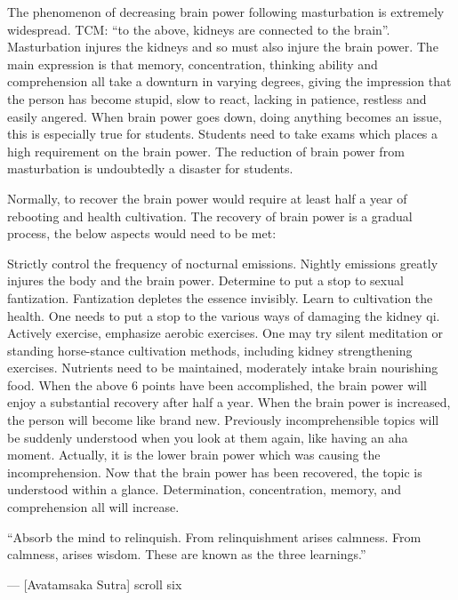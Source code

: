 \documentclass[
]{book}
\begin{document}
The phenomenon of decreasing brain power following masturbation is extremely widespread. TCM: ``to the above, kidneys are connected to the brain''. Masturbation injures the kidneys and so must also injure the brain power. The main expression is that memory, concentration, thinking ability and comprehension all take a downturn in varying degrees, giving the impression that the person has become stupid, slow to react, lacking in patience, restless and easily angered. When brain power goes down, doing anything becomes an issue, this is especially true for students. Students need to take exams which places a high requirement on the brain power. The reduction of brain power from masturbation is undoubtedly a disaster for students.

Normally, to recover the brain power would require at least half a year of rebooting and health cultivation. The recovery of brain power is a gradual process, the below aspects would need to be met:

Strictly control the frequency of nocturnal emissions. Nightly emissions greatly injures the body and the brain power.
Determine to put a stop to sexual fantization. Fantization depletes the essence invisibly.
Learn to cultivation the health. One needs to put a stop to the various ways of damaging the kidney qi.
Actively exercise, emphasize aerobic exercises.
One may try silent meditation or standing horse-stance cultivation methods, including kidney strengthening exercises.
Nutrients need to be maintained, moderately intake brain nourishing food.
When the above 6 points have been accomplished, the brain power will enjoy a substantial recovery after half a year. When the brain power is increased, the person will become like brand new. Previously incomprehensible topics will be suddenly understood when you look at them again, like having an aha moment. Actually, it is the lower brain power which was causing the incomprehension. Now that the brain power has been recovered, the topic is understood within a glance. Determination, concentration, memory, and comprehension all will increase.

``Absorb the mind to relinquish. From relinquishment arises calmness. From calmness, arises wisdom. These are known as the three learnings.''

--- {[}Avatamsaka Sutra{]} scroll six
\end{document}
